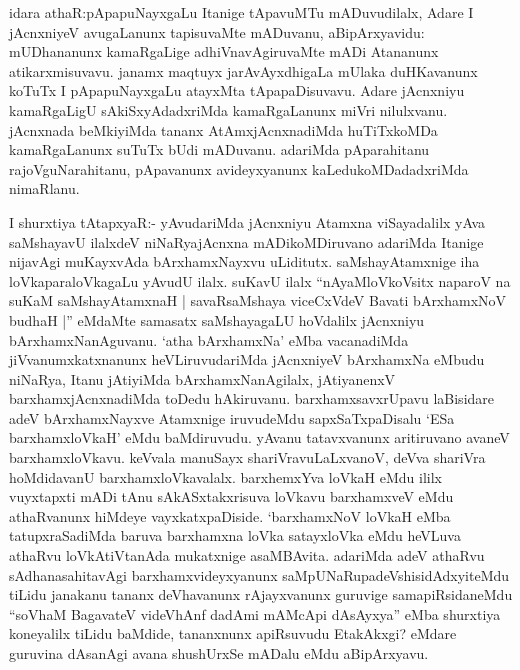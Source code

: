 
\begin{artha}
idara athaR:\ndash  pApapuNayxgaLu Itanige tApavuMTu mADuvudilalx, Adare I jAcnxniyeV avugaLanunx tapisuvaMte mADuvanu, aBipArxyavidu: mUDhananunx kamaRgaLige adhiVnavAgiruvaMte mADi Atananunx atikarxmisuvavu. janamx maqtuyx jarAvAyxdhigaLa mUlaka duHKavanunx koTuTx I pApapuNayxgaLu atayxMta tApapaDisuvavu. Adare jAcnxniyu kamaRgaLigU sAkiSxyAdadxriMda kamaRgaLanunx miVri nilulxvanu. jAcnxnada beMkiyiMda tananx AtAmxjAcnxnadiMda huTiTxkoMDa kamaRgaLanunx suTuTx bUdi mADuvanu. adariMda pAparahitanu rajoVguNarahitanu, pApavanunx avideyxyanunx kaLedukoMDadadxriMda nimaRlanu.
\end{artha}


\begin{artha}
I shurxtiya tAtapxyaR:- yAvudariMda jAcnxniyu Atamxna viSayadalilx yAva saMshayavU ilalxdeV niNaRyajAcnxna mADikoMDiru\-vano adariMda Itanige nijavAgi muKayxvAda bArxhamxNayxvu uLiditutx. saMshayAtamxnige iha loVkaparaloVkagaLu yAvudU ilalx. suKavU ilalx ``nAyaMloVkoVsitx naparoV na suKaM saMshayAtamxnaH | savaRsaMshaya viceCxVdeV Bavati bArxhamxNoV budhaH |'' eMdaMte samasatx saMshayagaLU hoVdalilx jAcnxniyu bArxhamxNanAguvanu. `atha bArxhamxNa' eMba vacanadiMda jiVvanumxkatxnanunx heVLiruvudariMda jAcnxniyeV bArxhamxNa eMbudu niNaRya, Itanu jAtiyiMda bArxhamxNanAgilalx, jAtiyanenxV barxhamxjAcnxnadiMda toDedu hAkiruvanu. barxhamxsavxrUpavu laBisidare adeV bArxhamxNayxve Atamxnige iruvudeMdu sapxSaTxpaDisalu `ESa barxhamxloVkaH' eMdu baMdiruvudu. yAvanu tatavxvanunx aritiruvano avaneV barxhamxloVkavu. keVvala manuSayx shariVravuLaLxvanoV, deVva shariVra hoMdidavanU barxhamxloVkavalalx. barxhemxYva loVkaH eMdu ililx vuyxtapxti mADi tAnu sAkASxtakxrisuva loVkavu barxhamxveV eMdu athaRvanunx hiMdeye vayxkatxpaDiside. `barxhamxNoV loVkaH eMba tatupxraSadiMda baruva barxhamxna loVka satayxloVka eMdu heVLuva athaRvu loVkAtiVtanAda mukatxnige asaMBAvita. adariMda adeV athaRvu sAdhanasahitavAgi barxhamxvideyxyanunx saMpUNaR\break upadeVshisidAdxyiteMdu tiLidu janakanu tananx deVhavanunx rAjayxvanunx guruvige samapiRsidaneMdu ``soV\s haM BagavateV videVhAnf dadAmi mAMcApi dAsAyxya'' eMba shurxtiya koneyalilx tiLidu baMdide, tananxnunx apiRsuvudu EtakAkxgi? eMdare guruvina dAsanAgi avana shushUrxSe mADalu eMdu aBipArxyavu.
\end{artha}

